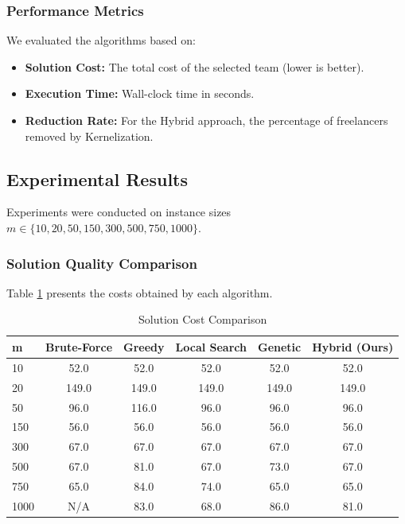 \subsubsection{Performance Metrics}
We evaluated the algorithms based on:
\begin{itemize}
    \item \textbf{Solution Cost:} The total cost of the selected team (lower is better).
    \item \textbf{Execution Time:} Wall-clock time in seconds.
    \item \textbf{Reduction Rate:} For the Hybrid approach, the percentage of freelancers removed by Kernelization.
\end{itemize}

\subsection{Experimental Results}
\label{subsec:experimental-results}

Experiments were conducted on instance sizes $m \in \{10, 20, 50, 150, 300, 500, 750, 1000\}$.

\subsubsection{Solution Quality Comparison}

Table \ref{tab:cost-comparison} presents the costs obtained by each algorithm.

\begin{table}[H]
\centering
\caption{Solution Cost Comparison}
\label{tab:cost-comparison}
\begin{tabular}{@{}lccccc@{}}
\toprule
\textbf{m} & \textbf{Brute-Force} & \textbf{Greedy} & \textbf{Local Search} & \textbf{Genetic} & \textbf{Hybrid (Ours)} \\
\midrule
10 & 52.0 & 52.0 & 52.0 & 52.0 & 52.0 \\
20 & 149.0 & 149.0 & 149.0 & 149.0 & 149.0 \\
50 & 96.0 & 116.0 & 96.0 & 96.0 & 96.0 \\
150 & 56.0 & 56.0 & 56.0 & 56.0 & 56.0 \\
300 & 67.0 & 67.0 & 67.0 & 67.0 & 67.0 \\
500 & 67.0 & 81.0 & 67.0 & 73.0 & 67.0 \\
750 & 65.0 & 84.0 & 74.0 & 65.0 & 65.0 \\
1000 & N/A & 83.0 & 68.0 & 86.0 & 81.0 \\
\bottomrule
\end{tabular}
\end{table}

